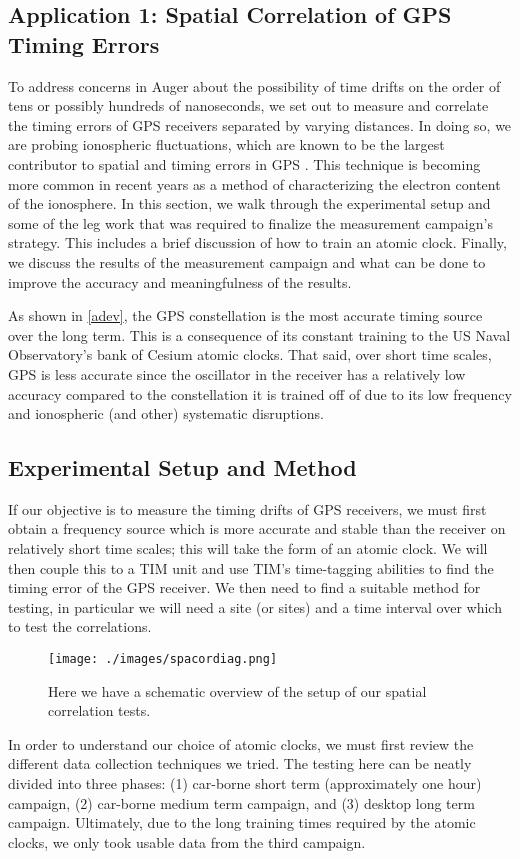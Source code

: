 \begin{singlespace}
\section{Application 1: Spatial Correlation of GPS Timing Errors}
\end{singlespace}
\label{spacor}
To address concerns in Auger about the possibility of time drifts on the order of tens or possibly hundreds of nanoseconds, we set out to measure and correlate the timing errors of GPS receivers separated by varying distances. In doing so, we are probing ionospheric fluctuations, which are known to be the largest contributor to spatial and timing errors in GPS \cite{milspec}. This technique is becoming more common in recent years \cite{atmoex,raulgps} as a method of characterizing the electron content of the ionosphere. In this section, we walk through the experimental setup and some of the leg work that was required to finalize the measurement campaign's strategy. This includes a brief discussion of how to train an atomic clock. Finally, we discuss the results of the measurement campaign and what can be done to improve the accuracy and meaningfulness of the results.

As shown in \autoref{adev}, the GPS constellation is the most accurate timing source over the long term. This is a consequence of its constant training to the US Naval Observatory's bank of Cesium atomic clocks. That said, over short time scales, GPS is less accurate since the oscillator in the receiver has a relatively low accuracy compared to the constellation it is trained off of due to its low frequency and ionospheric (and other) systematic disruptions.
\subsection{Experimental Setup and Method}
If our objective is to measure the timing drifts of GPS receivers, we must first obtain a frequency source which is more accurate and stable than the receiver on relatively short time scales; this will take the form of an atomic clock. We will then couple this to a TIM unit and use TIM's time-tagging abilities to find the timing error of the GPS receiver. We then need to find a suitable method for testing, in particular we will need a site (or sites) and a time interval over which to test the correlations. 
\begin{figure}[H]
\centering
\texttt{[image: ./images/spacordiag.png]}
\caption[Spatial Correlations Diagram]{Here we have a schematic overview of the setup of our spatial correlation tests.}
\label{spacordiag}
\end{figure}
In order to understand our choice of atomic clocks, we must first review the different data collection techniques we tried. The testing here can be neatly divided into three phases: (1) car-borne short term (approximately one hour) campaign, (2) car-borne medium term campaign, and (3) desktop long term campaign. Ultimately, due to the long training times required by the atomic clocks, we only took usable data from the third campaign. 

